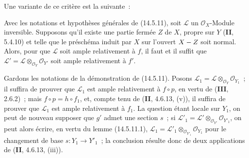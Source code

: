 Une variante de ce critère est la suivante~:

\begin{corollary}[14.5.12]
\label{IV.14.5.12-fr}
Avec les notations et hypothèses générales de \textup{(14.5.11)}, soit $\mathcal L$ un
$\mathcal O_X$-Module inversible. Supposons qu'il existe une partie fermée $Z$ de
$X$, propre sur $Y$ \textup{(\textbf{II}, 5.4.10)} et telle que le préschéma induit par $X$
sur l'ouvert $X- Z$ soit normal. Alors, pour que $\mathcal L$ soit ample relativement
à $f$, il faut et il suffit que
$\mathcal L'=\mathcal L\otimes_{\mathcal O_Y}\mathcal O_{Y'}$ soit ample
relativement à $f'$.
\end{corollary}

Gardons les notations de la démonstration de (14.5.11). Posons
$\mathcal L_1=\mathcal L\otimes_{\mathcal O_Y}\mathcal O_{Y_1}$~; il suffira de
prouver que $\mathcal L_1$ est ample relativement à $f\circ p$, en vertu de
(\textbf{III}, 2.6.2)~; mais $f\circ p=h\circ f_1$, et, compte tenu de
(\textbf{II}, 4.6.13, (v)), il suffira de prouver que $\mathcal L_1$ est ample
relativement à $f_1$. La question étant locale sur $Y_1$, on peut de nouveau
supposer que $g'$ admet une section $s$~; si
$\mathcal L'_1=\mathcal L'\otimes_{\mathcal O_{Y'}}\mathcal O_{Y'_1}$, on peut
alors écrire, en vertu du lemme (14.5.11.1),
$\mathcal L_1=\mathcal L'_1\otimes_{\mathcal O_{Y'_1}}\mathcal O_{Y_1}$ pour le
changement de base $s:Y_1\to Y'_1$~; la conclusion résulte donc de deux
applications de (\textbf{II}, 4.6.13, (iii)).

